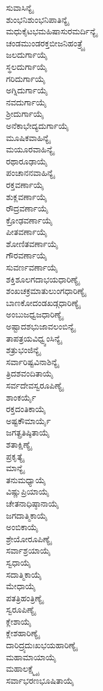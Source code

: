 \begin{multicols}{2}
ಸುವಾಸಿನ್ಯೈ\\
ಶುಂಭನಿಶುಂಭನಿಪಾತಿನ್ಯೈ\\
ಮಧುಕೈಟಭಮಹಿಷಾಸುರಮರ್ದಿನ್ಯೈ\\
ಚಂಡಮುಂಡರಕ್ತಬೀಜನಿಹಂತ್ರ್ಯೈ\\
ಜಲದುರ್ಗಾಯೈ\\
ಸ್ಥಲದುರ್ಗಾಯೈ\\
ಗರಿದುರ್ಗಾಯೈ\\
ಅಗ್ನಿದುರ್ಗಾಯೈ\\
ನವದುರ್ಗಾಯೈ\\
ಶ್ರೀದುರ್ಗಾಯೈ\\
ಅನೆಕಾಭೇದ್ಯದುರ್ಗಾಯೈ\\
ಮೂಷಿಕವಾಹಿನ್ಯೈ\\
ಮಯೂರವಾಹಿನ್ಯೈ\\
ರಥಾರೂಢಾಯೈ\\
ಪಂಚಾನನವಾಹಿನ್ಯೈ\\
ರಕ್ತವರ್ಣಾಯೈ\\
ಶುಕ್ಲವರ್ಣಾಯೈ\\
ರೌದ್ರವರ್ಣಾಯೈ\\
ಕ್ರೋಢವರ್ಣಾಯೈ\\
ಪೀತವರ್ಣಾಯೈ\\
ಶೋಣಿತವರ್ಣಾಯೈ\\
ಗೌರವರ್ಣಾಯೈ\\
ಸುವರ್ಣವರ್ಣಾಯೈ\\
ಶಕ್ತಿಶೂಲಗದಾಭಯಧಾರಿಣ್ಯೈ\\
ಶಂಖಚಕ್ರಮಾತುಲುಂಗಧಾರಿಣ್ಯೈ\\
ಬಾಣಕೋದಂಡಖಡ್ಗಧಾರಿಣ್ಯೈ\\
ಅಂಬುಜಧ್ವಜಧಾರಿಣ್ಯೈ\\
ಅಷ್ಟಾದಶಭುಜಾವಲಂಬಿನ್ಯೈ\\
ತಾಪತ್ರಯವಿಧ್ವ್ವಂಸಿನ್ಯೈ\\
ಶತ್ರುಭಂಜಿನ್ಯೈ\\
ಸರ್ವಾರಿಷ್ಟವಿನಾಶಿನ್ಯೈ\\
ತ್ರಿದಶವಂದಿತಾಯೈ\\
ಸರ್ವದೇವಸ್ವರೂಪಿಣ್ಯೈ\\
ಶಾಂಕರ್ಯೈ\\
ರಕ್ತದಂತಿಕಾಯೈ\\
ಅಷ್ಟಕೌಮಾರ್ಯೈ\\
ಜಗತ್ಪ್ರತಿಷ್ಠಿತಾಯೈ\\
ಶತಾಕ್ಷಿಣ್ಯೈ\\
ಪ್ರಕೃತ್ಯೈ\\
ಮಾನ್ಯೈ\\
ತನುಮಧ್ಯಾಯೈ\\
ವಿಷ್ಣುಪ್ರಿಯಾಯೈ\\
ಚೇತನಾಧಿಷ್ಠಾನಾಯೈ\\
ಜಗದಾತ್ಮಿಕಾಯೈ\\
ಅಂಬಿಕಾಯೈ\\
ಶ್ರೇಯೋರೂಪಿಣ್ಯೈ\\
ಸರ್ವಾಶ್ರಯಾಯೈ\\
ಸ್ವಧಾಯೈ\\
ಸದಾತ್ಮಿಕಾಯೈ\\
ಮೇಧಾಯೈ\\
ಪತತ್ರಿಹಂತ್ರಿಣ್ಯೈ\\
ಸ್ವರೂಪಿಣ್ಯೈ\\
ಕ್ಲೇಶಾಯೈ\\
ಕ್ಲೇಶಹಾರಿಣ್ಯೈ\\
ದಾರಿದ್ರ್ಯದುಃಖಭಯಹಾರಿಣ್ಯೈ\\
ಮಹಾಮಾಯಾಯೈ\\
ಮಹಾಲಕ್ಷ್ಮ್ಯೈ\\
ಸರ್ವಾಭರಣಭೂಷಿತಾಯೈ
\end{multicols}

